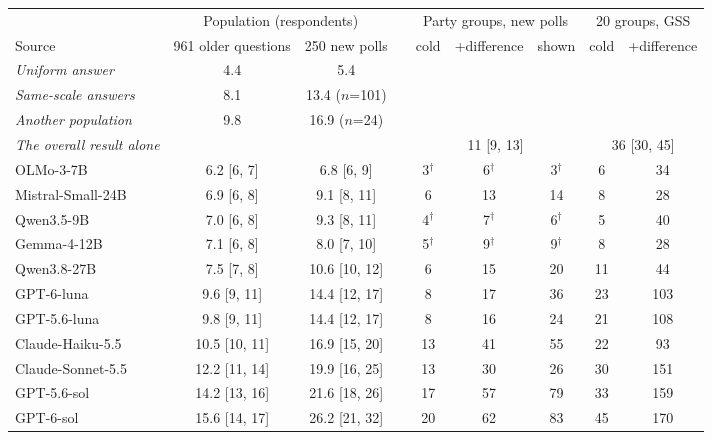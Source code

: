 \begin{table}[t]
\centering\small
\setlength{\tabcolsep}{3.2pt}
\begin{tabular}{lcccccccc}
\toprule
 & \multicolumn{2}{c}{Population (respondents)} & & \multicolumn{3}{c}{Party groups, new polls} & \multicolumn{2}{c}{20 groups, GSS} \\
\cmidrule(lr){2-3}\cmidrule(lr){5-7}\cmidrule(lr){8-9}
Source & 961 older questions & 250 new polls & & cold & +difference & shown & cold & +difference \\
\midrule
\emph{Uniform answer} & 4.4 & 5.4 & & & & & & \\
\emph{Same-scale answers} & 8.1 & 13.4 {\scriptsize($n$=101)} & & & & & & \\
\emph{Another population} & 9.8 & 16.9 {\scriptsize($n$=24)} & & & & & & \\
\emph{The overall result alone} & & & & \multicolumn{3}{c}{11 {\scriptsize[9, 13]}} & \multicolumn{2}{c}{36 {\scriptsize[30, 45]}} \\
\midrule
OLMo-3-7B & 6.2 {\scriptsize[6, 7]} & 6.8 {\scriptsize[6, 9]} & & 3$^\dagger$ & 6$^\dagger$ & 3$^\dagger$ & 6 & 34 \\
Mistral-Small-24B & 6.9 {\scriptsize[6, 8]} & 9.1 {\scriptsize[8, 11]} & & 6 & 13 & 14 & 8 & 28 \\
Qwen3.5-9B & 7.0 {\scriptsize[6, 8]} & 9.3 {\scriptsize[8, 11]} & & 4$^\dagger$ & 7$^\dagger$ & 6$^\dagger$ & 5 & 40 \\
Gemma-4-12B & 7.1 {\scriptsize[6, 8]} & 8.0 {\scriptsize[7, 10]} & & 5$^\dagger$ & 9$^\dagger$ & 9$^\dagger$ & 8 & 28 \\
Qwen3.8-27B & 7.5 {\scriptsize[7, 8]} & 10.6 {\scriptsize[10, 12]} & & 6 & 15 & 20 & 11 & 44 \\
GPT-6-luna & 9.6 {\scriptsize[9, 11]} & 14.4 {\scriptsize[12, 17]} & & 8 & 17 & 36 & 23 & 103 \\
GPT-5.6-luna & 9.8 {\scriptsize[9, 11]} & 14.4 {\scriptsize[12, 17]} & & 8 & 16 & 24 & 21 & 108 \\
Claude-Haiku-5.5 & 10.5 {\scriptsize[10, 11]} & 16.9 {\scriptsize[15, 20]} & & 13 & 41 & 55 & 22 & 93 \\
Claude-Sonnet-5.5 & 12.2 {\scriptsize[11, 14]} & 19.9 {\scriptsize[16, 25]} & & 13 & 30 & 26 & 30 & 151 \\
GPT-5.6-sol & 14.2 {\scriptsize[13, 16]} & 21.6 {\scriptsize[18, 26]} & & 17 & 57 & 79 & 33 & 159 \\
GPT-6-sol & 15.6 {\scriptsize[14, 17]} & 26.2 {\scriptsize[21, 32]} & & 20 & 62 & 83 & 45 & 170 \\

\end{tabular}
\end{table}
